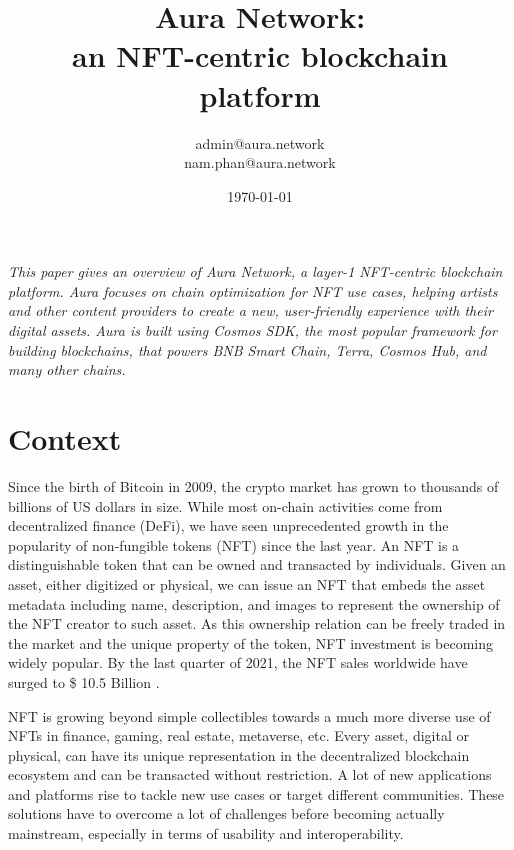 \documentclass[11pt, titlepage]{article}
\begin{document}
\title{Aura Network:\\
an NFT-centric blockchain platform}
\author{
admin@aura.network\\
nam.phan@aura.network}
\date{\today}
\maketitle

\tableofcontents
\newpage

\textit{
This paper gives an overview of \emph{Aura Network}, a layer-1 NFT-centric blockchain platform. Aura focuses on chain optimization for NFT use cases, helping artists and other content providers to create a new, user-friendly experience with their digital assets. Aura is built using Cosmos SDK, the most popular framework for building blockchains, that powers BNB Smart Chain, Terra, Cosmos Hub, and many other chains.
}

\section{Context}

Since the birth of Bitcoin in 2009, the crypto market has grown to thousands of billions of US dollars in size. While most on-chain activities come from decentralized finance (DeFi), we have seen unprecedented growth in the popularity of non-fungible tokens (NFT) since the last year. An NFT is a distinguishable token that can be owned and transacted by individuals. 
Given an asset, either digitized or physical, we can issue an NFT that embeds the asset metadata including name, description, and images to represent the ownership of the NFT creator to such asset. As this ownership relation can be freely traded in the market and the unique property of the token, NFT investment is becoming widely popular. By the last quarter of 2021, the NFT sales worldwide have surged to \$ 10.5 Billion \cite{nftsale}. 

NFT is growing beyond simple collectibles towards a much more diverse use of NFTs in finance, gaming, real estate, metaverse, etc. Every asset, digital or physical, can have its unique representation in the decentralized blockchain ecosystem and can be transacted without restriction. A lot of new applications and platforms rise to tackle new use cases or target different communities. These solutions have to overcome a lot of challenges before becoming actually mainstream, especially in terms of usability and interoperability. 
\end{document}
